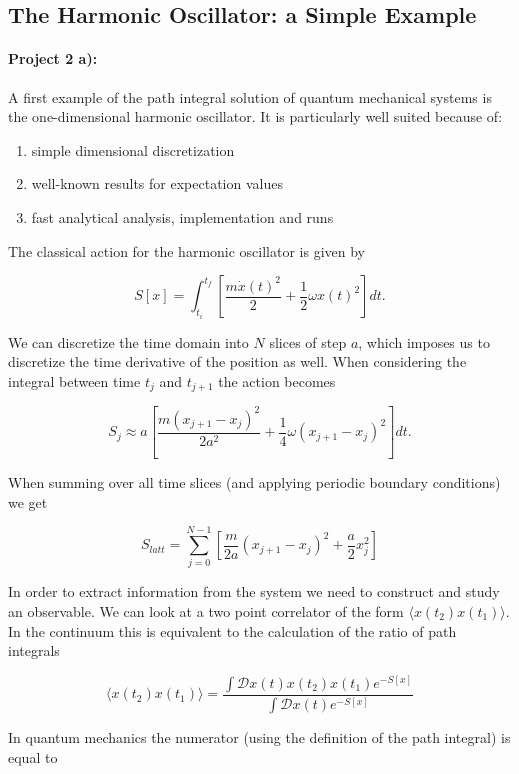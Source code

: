 \documentclass[%
oneside,                 %
final,                   %
10pt]{article}
\begin{document}
\subsection*{The Harmonic Oscillator: a Simple Example}

\paragraph{Project 2 a):}
A first example of the path integral solution of quantum mechanical
systems is the one-dimensional harmonic oscillator. It is particularly
well suited because of:

\begin{enumerate}
\item simple dimensional discretization

\item well-known results for expectation values

\item fast analytical analysis, implementation and runs 
\end{enumerate}

\noindent
The classical action for the harmonic oscillator is given by

\[
	S[x] = \int_{t_i}^{t_f} \left[ \frac{m\dot{x}(t)^2}{2} + \frac{1}{2}\omega x(t)^2\right] dt.
\]

We can discretize the time domain into $N$ slices of step $a$, which
imposes us to discretize the time derivative of the position as
well. When considering the integral between time $t_j$ and $t_{j+1}$
the action becomes

\[
	S_{j} \approx a\left[ \frac{m(x_{j+1}-x_j)^2}{2a^2} + \frac{1}{4}\omega (x_{j+1} - x_j)^2 \right] dt.
\]

When summing over all time slices (and applying periodic boundary conditions) we get

\[	
	S_{latt} = \sum_{j = 0}^{N-1} \left[ \frac{m}{2a}(x_{j+1}-x_j)^2 + \frac{a}{2} x_j^2 \right]
\]

In order to extract information from the system we need to construct
and study an observable. We can look at a two point correlator of the
form $\langle x(t_2)x(t_1) \rangle$.  In the continuum this is
equivalent to the calculation of the ratio of path integrals

\[
	\langle x(t_2)x(t_1) \rangle = \frac{\int \mathcal{D} x(t) x(t_2) x(t_1) e^{-S[x]}}{\int \mathcal{D} x(t) e^{-S[x]}}
\]

In quantum mechanics the numerator (using the definition of the path integral) is equal to
\end{document}
